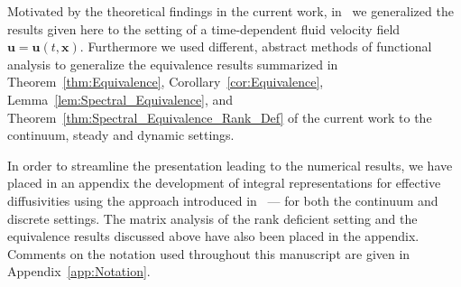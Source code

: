 \documentclass[english,12pt,jmp,graphicx]{revtex4-1}
\newcommand{\vecu}{\boldsymbol{u}}
\newcommand{\vecx}{\boldsymbol{x}}
\newcommand{\thmref}[1]{Theorem~\ref{#1}}
\newcommand{\corref}[1]{Corollary~\ref{#1}}
\newcommand{\lemref}[1]{Lemma~\ref{#1}}
\newcommand{\secref}[1]{Section~\ref{#1}}
\newcommand{\appref}[1]{Appendix~\ref{#1}}
\newcommand{\Dg}{\mathfrak{D}}
\begin{document}
Motivated by the theoretical findings in the current work,
in~\cite{Murphy:ADSTPF-2017} we generalized the results given here to
the setting of a time-dependent fluid velocity field
$\vecu=\vecu(t,\vecx)$. Furthermore we used different, abstract
methods of functional analysis to generalize the equivalence results
summarized in \thmref{thm:Equivalence}, \corref{cor:Equivalence},
\lemref{lem:Spectral_Equivalence}, and
\thmref{thm:Spectral_Equivalence_Rank_Def} of the current work to the
continuum, steady and dynamic settings.



In order to streamline the presentation leading to
the numerical results, we have placed in an appendix the development
of integral representations for effective diffusivities using the approach
introduced in~\cite{Avellaneda:PRL-753,Avellaneda:CMP-339} --- for both
the continuum and discrete settings. The matrix analysis of the rank
deficient setting and the equivalence results discussed above have
also been placed in the appendix. Comments on the notation used
throughout this manuscript are given in \appref{app:Notation}.






\end{document}
